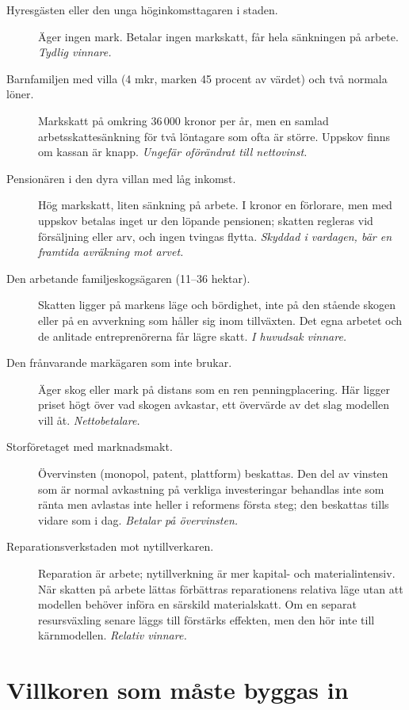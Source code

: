 \documentclass[11pt]{article}
\begin{document}
\begin{description}
\item[Hyresgästen eller den unga höginkomsttagaren i staden.] Äger ingen mark. Betalar ingen markskatt, får hela sänkningen på arbete. \emph{Tydlig vinnare.}
\item[Barnfamiljen med villa (4 mkr, marken 45 procent av värdet) och två normala löner.] Markskatt på omkring 36\,000 kronor per år, men en samlad arbetsskattesänkning för två löntagare som ofta är större. Uppskov finns om kassan är knapp. \emph{Ungefär oförändrat till nettovinst.}
\item[Pensionären i den dyra villan med låg inkomst.] Hög markskatt, liten sänkning på arbete. I kronor en förlorare, men med uppskov betalas inget ur den löpande pensionen; skatten regleras vid försäljning eller arv, och ingen tvingas flytta. \emph{Skyddad i vardagen, bär en framtida avräkning mot arvet.}
\item[Den arbetande familjeskogsägaren (11--36 hektar).] Skatten ligger på markens läge och bördighet, inte på den stående skogen eller på en avverkning som håller sig inom tillväxten. Det egna arbetet och de anlitade entreprenörerna får lägre skatt. \emph{I huvudsak vinnare.}
\item[Den frånvarande markägaren som inte brukar.] Äger skog eller mark på distans som en ren penningplacering. Här ligger priset högt över vad skogen avkastar, ett övervärde av det slag modellen vill åt. \emph{Nettobetalare.}
\item[Storföretaget med marknadsmakt.] Övervinsten (monopol, patent, plattform) beskattas. Den del av vinsten som är normal avkastning på verkliga investeringar behandlas inte som ränta men avlastas inte heller i reformens första steg; den beskattas tills vidare som i dag. \emph{Betalar på övervinsten.}
\item[Reparationsverkstaden mot nytillverkaren.] Reparation är arbete; nytillverkning är mer kapital- och materialintensiv. När skatten på arbete lättas förbättras reparationens relativa läge utan att modellen behöver införa en särskild materialskatt. Om en separat resursväxling senare läggs till förstärks effekten, men den hör inte till kärnmodellen. \emph{Relativ vinnare.}
\end{description}

\section{Villkoren som måste byggas in}
\end{document}
